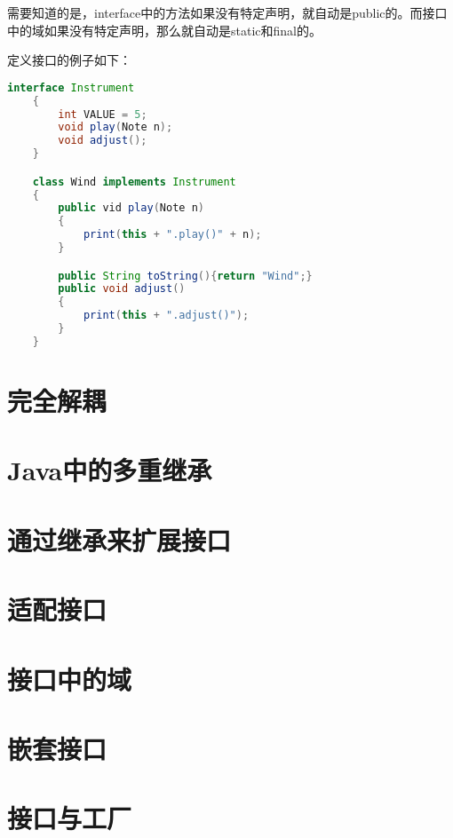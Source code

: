 \documentclass[a4paper,left=2.5cm,right=2.5cm,11pt]{article}
\begin{document}
	需要知道的是，interface中的方法如果没有特定声明，就自动是public的。而接口中的域如果没有特定声明，那么就自动是static和final的。\par

	定义接口的例子如下：
	\begin{lstlisting}[language = java]
	interface Instrument
	{
		int VALUE = 5;
		void play(Note n);
		void adjust();
	}

	class Wind implements Instrument
	{
		public vid play(Note n)
		{
			print(this + ".play()" + n);
		}

		public String toString(){return "Wind";}
		public void adjust()
		{
			print(this + ".adjust()");
		}
	}
	\end{lstlisting}

\section{完全解耦}

\section{Java中的多重继承}

\section{通过继承来扩展接口}

\section{适配接口}

\section{接口中的域}

\section{嵌套接口}

\section{接口与工厂}
\end{document}
